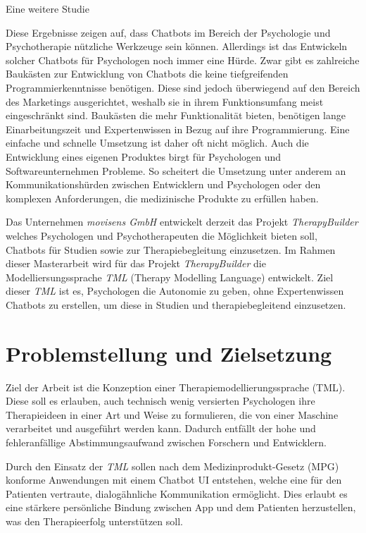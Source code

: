 Eine weitere Studie 

Diese Ergebnisse zeigen auf, dass Chatbots im Bereich der Psychologie und Psychotherapie nützliche Werkzeuge sein können. Allerdings ist das Entwickeln solcher Chatbots für Psychologen noch immer eine Hürde. Zwar gibt es zahlreiche Baukästen zur Entwicklung von Chatbots die keine tiefgreifenden Programmierkenntnisse benötigen. Diese sind jedoch überwiegend auf den Bereich des Marketings ausgerichtet, weshalb sie in ihrem Funktionsumfang meist eingeschränkt sind. Baukästen die mehr Funktionalität bieten, benötigen lange Einarbeitungszeit und Expertenwissen in Bezug auf ihre Programmierung. Eine einfache und schnelle Umsetzung ist daher oft nicht möglich. Auch die Entwicklung eines eigenen Produktes birgt für Psychologen und Softwareunternehmen Probleme. So scheitert die Umsetzung unter anderem an Kommunikationshürden zwischen Entwicklern und Psychologen oder den komplexen Anforderungen, die medizinische Produkte zu erfüllen haben. 

Das Unternehmen \emph{movisens GmbH} entwickelt derzeit das Projekt \emph{TherapyBuilder} welches Psychologen und Psychotherapeuten die Möglichkeit bieten soll, Chatbots  für Studien sowie zur Therapiebegleitung einzusetzen. Im Rahmen dieser Masterarbeit wird für das Projekt \emph{TherapyBuilder} die Modelliersungssprache \emph{TML} (Therapy Modelling Language) entwickelt. Ziel dieser \emph{TML} ist es, Psychologen die Autonomie zu geben, ohne Expertenwissen Chatbots zu erstellen, um diese in Studien und therapiebegleitend einzusetzen.


\section{Problemstellung und Zielsetzung}

Ziel der Arbeit ist die Konzeption einer Therapiemodellierungssprache (TML). Diese soll es erlauben, auch technisch wenig versierten Psychologen ihre Therapieideen in einer Art und Weise zu formulieren, die von einer Maschine verarbeitet und ausgeführt werden kann. Dadurch entfällt der hohe und fehleranfällige Abstimmungsaufwand zwischen Forschern und Entwicklern. 

Durch den Einsatz der \emph{TML} sollen nach dem Medizinprodukt-Gesetz (MPG) konforme Anwendungen mit einem Chatbot UI entstehen, welche eine für den Patienten vertraute, dialogähnliche Kommunikation ermöglicht. Dies erlaubt es eine stärkere persönliche Bindung zwischen App und dem Patienten herzustellen, was den Therapieerfolg unterstützen soll. 

